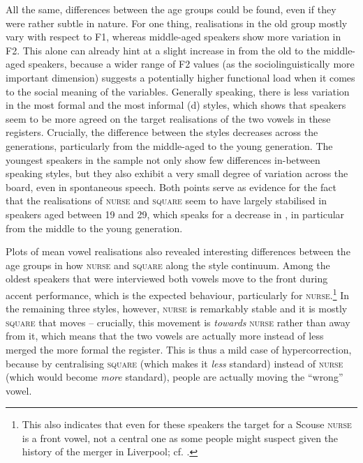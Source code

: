All the same, differences between the age groups could be found, even if they were rather subtle in nature.
For one thing, realisations in the old group mostly vary with respect to F1, whereas middle-aged speakers show more variation in F2.
This alone can already hint at a slight increase in  from the old to the middle-aged speakers, because a wider range of F2 values (as the sociolinguistically more important dimension) suggests a potentially higher functional load when it comes to the social meaning of the variables.
Generally speaking, there is less variation in the most formal and the most informal (d) styles, which shows that speakers seem to be more agreed on the target realisations of the two vowels in these registers.
Crucially, the difference between the styles decreases across the generations, particularly from the middle-aged to the young generation.
The youngest speakers in the sample not only show few differences in-between speaking styles, but they also exhibit a very small degree of variation across the board, even in spontaneous speech.
Both points serve as evidence for the fact that the realisations of \textsc{nurse} and \textsc{square} seem to have largely stabilised in speakers aged between 19 and 29, which speaks for a decrease in , in particular from the middle to the young generation.

\largerpage
Plots of mean vowel realisations also  {revealed } interesting differences between the age groups in how \textsc{nurse} and \textsc{square}  along the style continuum.
Among the oldest speakers that were interviewed both vowels move to the front during accent performance, which is the expected behaviour, particularly for \textsc{nurse}.\footnote{This also indicates that even for these speakers the target for a Scouse \textsc{nurse} is a front vowel, not a central one as some people might suspect given the history of the merger in Liverpool; cf. .}
In the remaining three styles, however, \textsc{nurse} is remarkably stable and it is mostly \textsc{square} that moves -- crucially, this movement is \emph{towards} \textsc{nurse} rather than away from it, which means that the two vowels are actually more instead of less merged the more formal the register.
This is thus a mild case of hypercorrection, because by centralising \textsc{square} (which makes it \emph{less} standard) instead of \textsc{nurse} (which would become \emph{more} standard), people are actually moving the ``wrong'' vowel.

